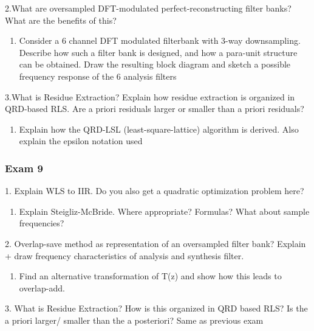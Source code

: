 \documentclass[
  a4paper,
  ,captions=tableheading
]{scrartcl}
\providecommand{\tightlist}{%
  \setlength{\itemsep}{0pt}\setlength{\parskip}{0pt}}
\begin{document}
2.What are oversampled DFT-modulated perfect-reconstructing filter
banks?What are the benefits of this?

\begin{enumerate}
\def\labelenumi{\arabic{enumi}.}
\tightlist
\item
  Consider a 6 channel DFT modulated filterbank with 3-way downsampling.
  Describe how such a filter bank is designed, and how a para-unit
  structure can be obtained. Draw the resulting block diagram and sketch
  a possible frequency response of the 6 analysis filters
\end{enumerate}

3.What is Residue Extraction? Explain how residue extraction is
organized in QRD-based RLS. Are a priori residuals larger or smaller
than a priori residuals?

\begin{enumerate}
\def\labelenumi{\arabic{enumi}.}
\tightlist
\item
  Explain how the QRD-LSL (least-square-lattice) algorithm is derived.
  Also explain the epsilon notation used
\end{enumerate}

\subsubsection{Exam 9}\label{exam-9}

1. Explain WLS to IIR. Do you also get a quadratic optimization problem
here?

\begin{enumerate}
\def\labelenumi{\arabic{enumi}.}
\tightlist
\item
  Explain Steigliz-McBride. Where appropriate? Formulas? What about
  sample frequencies?
\end{enumerate}

2. Overlap-save method as representation of an oversampled filter bank?
Explain + draw frequency characteristics of analysis and synthesis
filter.

\begin{enumerate}
\def\labelenumi{\arabic{enumi}.}
\tightlist
\item
  Find an alternative transformation of T(z) and show how this leads to
  overlap-add.
\end{enumerate}

3. What is Residue Extraction? How is this organized in QRD based RLS?
Is the a priori larger/ smaller than the a posteriori? Same as previous
exam
\end{document}
